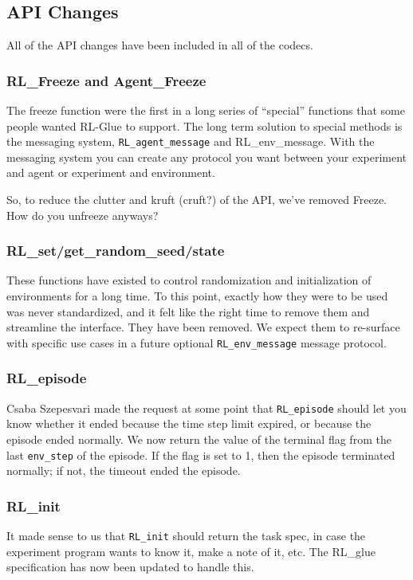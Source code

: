 \documentclass[11pt]{article}
\begin{document}
\subsection{API Changes}
All of the API changes have been included in all of the codecs.


\subsubsection{RL\_Freeze and Agent\_Freeze}
The freeze function were the first in a long series of ``special'' functions that some people wanted RL-Glue to support.  The long term solution to special methods is the messaging system, \texttt{RL\_agent\_message} and RL\_env\_message. With the messaging system you can create any protocol you want between your experiment and agent or experiment and environment.

So, to reduce the clutter and kruft (cruft?) of the API, we've removed Freeze.  How do you unfreeze anyways?

\subsubsection{RL\_set/get\_random\_seed/state}
These functions have existed to control randomization and initialization of environments for a long time.  To this point, exactly how they were to be used was never standardized, and it felt like the right time to remove them and streamline the interface.  They have been removed.  We expect them to re-surface with specific use cases in a future optional \texttt{RL\_env\_message} message protocol.

\subsubsection{RL\_episode}
Csaba Szepesvari made the request at some point that \texttt{RL\_episode} should let you know whether it ended because the time step limit expired, or because the episode ended normally.  We now return the value of the terminal flag from the last \texttt{env\_step} of the episode. If the flag is set to 1, then the episode terminated normally; if not, the timeout ended the episode.  

\subsubsection{RL\_init}
It made sense to us that \texttt{RL\_init} should return the task spec, in case the experiment program wants to know it, make a note of it, etc. The RL\_glue specification has now been updated to handle this.
\end{document}
